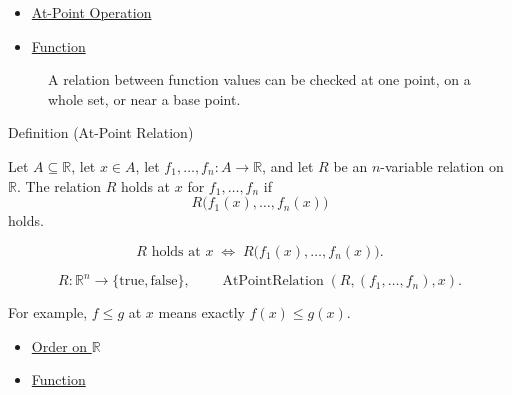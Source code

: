 \begin{dependencies}
\begin{itemize}
  \item \hyperref[def:at-point-operation]{At-Point Operation}
  \item \hyperref[def:function]{Function}
\end{itemize}
\end{dependencies}

\begin{figure}[htbp]
\centering

\caption{A relation between function values can be checked at one point, on a whole set, or near a base point.}
\label{fig:at-point-on-set-near-point}
\end{figure}

\begin{definitionbox}{Definition (At-Point Relation)}
\begin{definition}
\label{def:at-point-relation}
Let \(A\subseteq\mathbb{R}\), let \(x\in A\), let
\(f_1,\ldots,f_n:A\to\mathbb{R}\), and let \(R\) be an \(n\)-variable
relation on \(\mathbb{R}\).  The relation \(R\) holds at \(x\) for
\(f_1,\ldots,f_n\) if
\[
  R\bigl(f_1(x),\ldots,f_n(x)\bigr)
\]
holds.
\end{definition}
\end{definitionbox}

\begin{remark*}
\[
  R\text{ holds at }x
  \;\Longleftrightarrow\;
  R\bigl(f_1(x),\ldots,f_n(x)\bigr).
\]
\end{remark*}

\begin{remark*}
\[
  R\colon \mathbb{R}^n\to\{\mathrm{true},\mathrm{false}\},\qquad
  \operatorname{AtPointRelation}(R,(f_1,\ldots,f_n),x).
\]
\end{remark*}

\begin{remark*}[Interpretation]
For example, \(f\leq g\) at \(x\) means exactly \(f(x)\leq g(x)\).
\end{remark*}

\begin{dependencies}
\begin{itemize}
  \item \hyperref[def:order-on-r]{Order on \(\mathbb{R}\)}
  \item \hyperref[def:function]{Function}
\end{itemize}
\end{dependencies}

